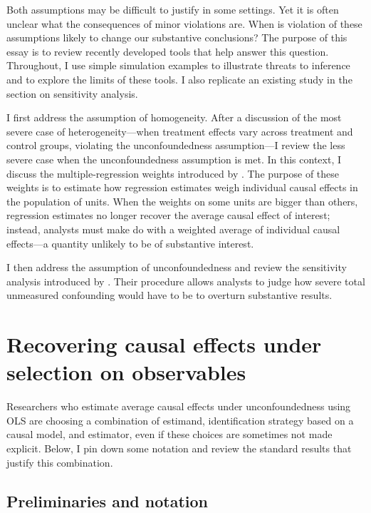 \documentclass[hidelinks,11pt]{article}
\begin{document}
Both assumptions may be difficult to justify in some settings. Yet it is often unclear what the consequences of minor violations are. When is violation of these assumptions likely to change our substantive conclusions? The purpose of this essay is to review recently developed tools that help answer this question. Throughout, I use simple simulation examples to illustrate threats to inference and to explore the limits of these tools. I also replicate an existing study in the section on sensitivity analysis.

I first address the assumption of homogeneity. After a discussion of the most severe case of heterogeneity---when treatment effects vary across treatment and control groups, violating the unconfoundedness assumption---I review the less severe case when the unconfoundedness assumption is met. In this context, I discuss the multiple-regression weights introduced by \citet{aronowsamii2016}. The purpose of these weights is to estimate how regression estimates weigh individual causal effects in the population of units. When the weights on some units are bigger than others, regression estimates no longer recover the average causal effect of interest; instead, analysts must make do with a weighted average of individual causal effects---a quantity unlikely to be of substantive interest.

I then address the assumption of unconfoundedness and review the sensitivity analysis introduced by \citet{cinellihazlett2020}. Their procedure allows analysts to judge how severe total unmeasured confounding would have to be to overturn substantive results.

\section{Recovering causal effects under selection on observables}

Researchers who estimate average causal effects under unconfoundedness using OLS are choosing a combination of estimand, identification strategy based on a causal model, and estimator, even if these choices are sometimes not made explicit. Below, I pin down some notation and review the standard results that justify this combination.

\subsection{Preliminaries and notation}
\end{document}
